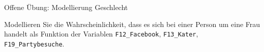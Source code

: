 \documentclass[ignorenonframetext,]{beamer}
\begin{document}
\begin{frame}[fragile]{Offene Übung: Modellierung Geschlecht}

Modellieren Sie die Wahrscheinlichkeit, dass es sich bei einer Person um
eine Frau handelt als Funktion der Variablen \texttt{F12\_Facebook},
\texttt{F13\_Kater}, \texttt{F19\_Partybesuche}.

\end{frame}
\end{document}
